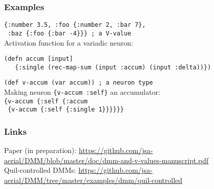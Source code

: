 \documentclass{beamer}
\begin{document}
\begin{frame}[fragile]

  \frametitle{Examples}

{\footnotesize \tt \{:number 3.5, :foo \{:number 2, :bar 7\},\\ \ :baz \{:foo \{:bar -4\}\}\} ; a V-value }\\[2ex]

Activation function for a variadic neuron:
{\footnotesize
\begin{verbatim}
(defn accum [input]
   {:single (rec-map-sum (input :accum) (input :delta))})
\end{verbatim}
}

{\footnotesize \tt (def v-accum (var accum)) ; a neuron type}\\[2ex] 

Making neuron {\footnotesize \tt \{v-accum :self\}} an accumulator:\\[2ex]

{\footnotesize \tt \{v-accum \{:self \{:accum\\ \ \{v-accum \{:self \{:single 1\}\}\}\}\}\}}


\end{frame}

\begin{frame}

  \frametitle{Links}

Paper (in preparation):
{\footnotesize \url{https://github.com/jsa-aerial/DMM/blob/master/doc/dmm-and-v-values-manuscript.pdf}}\\[6ex]

Quil-controlled  DMMs:
{\footnotesize \url{https://github.com/jsa-aerial/DMM/tree/master/examples/dmm/quil-controlled}}

\end{frame}
\end{document}
